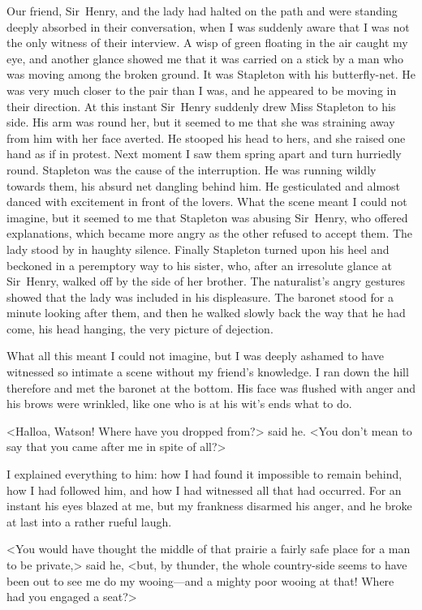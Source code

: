 Our friend, Sir~Henry, and the lady had halted on the path and were standing deeply absorbed in their conversation, when I was suddenly aware that I was not the only witness of their interview. A wisp of green floating in the air caught my eye, and another glance showed me that it was carried on a stick by a man who was moving among the broken ground. It was Stapleton with his butterfly-net. He was very much closer to the pair than I was, and he appeared to be moving in their direction. At this instant Sir~Henry suddenly drew Miss Stapleton to his side. His arm was round her, but it seemed to me that she was straining away from him with her face averted. He stooped his head to hers, and she raised one hand as if in protest. Next moment I saw them spring apart and turn hurriedly round. Stapleton was the cause of the interruption. He was running wildly towards them, his absurd net dangling behind him. He gesticulated and almost danced with excitement in front of the lovers. What the scene meant I could not imagine, but it seemed to me that Stapleton was abusing Sir~Henry, who offered explanations, which became more angry as the other refused to accept them. The lady stood by in haughty silence. Finally Stapleton turned upon his heel and beckoned in a peremptory way to his sister, who, after an irresolute glance at Sir~Henry, walked off by the side of her brother. The naturalist's angry gestures showed that the lady was included in his displeasure. The baronet stood for a minute looking after them, and then he walked slowly back the way that he had come, his head hanging, the very picture of dejection.

What all this meant I could not imagine, but I was deeply a\-shamed to have witnessed so intimate a scene without my friend's knowledge. I ran down the hill therefore and met the baronet at the bottom. His face was flushed with anger and his brows were wrin\-kled, like one who is at his wit's ends what to do.

<Halloa, Watson! Where have you dropped from?> said he. <You don't mean to say that you came after me in spite of all?>

I explained everything to him: how I had found it impossible to remain behind, how I had followed him, and how I had witnessed all that had occurred. For an instant his eyes blazed at me, but my frankness disarmed his anger, and he broke at last into a rather rueful laugh.

<You would have thought the middle of that prairie a fairly safe place for a man to be private,> said he, <but, by thunder, the whole country-side seems to have been out to see me do my wooing—and a mighty poor wooing at that! Where had you engaged a seat?>

